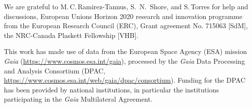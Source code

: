 \documentclass[apjl,twocolumn]{emulateapj}
\DeclareRobustCommand{\Figref}[1]{Fig.~\ref{#1}}
\begin{document}
 \begin{acknowledgements}
   \small
   We are grateful to M.\,C.\,Ramirez-Tannus, S.~N.~Shore, and S.\,Torres
   for help and discussions, European Unions Horizon 2020 research and innovation programme from the European Research Council (ERC), Grant agreement No. 715063 [SdM], the NRC-Canada Plaskett Fellowship [VHB].
   
This work has made use of data from the European Space Agency (ESA) mission {\it Gaia} (\url{https://www.cosmos.esa.int/gaia}), processed by the {\it Gaia} Data Processing and Analysis Consortium (DPAC, \url{https://www.cosmos.esa.int/web/gaia/dpac/consortium}). Funding for the DPAC has been provided by national institutions, in particular the institutions
participating in the {\it Gaia} Multilateral Agreement. 
   
 \end{acknowledgements}
\end{document}
